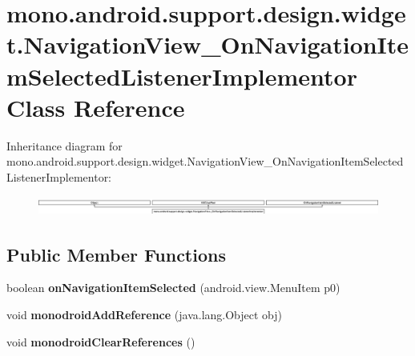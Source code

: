 \hypertarget{classmono_1_1android_1_1support_1_1design_1_1widget_1_1NavigationView__OnNavigationItemSelectedListenerImplementor}{}\section{mono.\+android.\+support.\+design.\+widget.\+Navigation\+View\+\_\+\+On\+Navigation\+Item\+Selected\+Listener\+Implementor Class Reference}
\label{classmono_1_1android_1_1support_1_1design_1_1widget_1_1NavigationView__OnNavigationItemSelectedListenerImplementor}
Inheritance diagram for mono.\+android.\+support.\+design.\+widget.\+Navigation\+View\+\_\+\+On\+Navigation\+Item\+Selected\+Listener\+Implementor\+:\begin{figure}[H]
\begin{center}
\leavevmode
\includegraphics[height=0.640366cm]{classmono_1_1android_1_1support_1_1design_1_1widget_1_1NavigationView__OnNavigationItemSelectedListenerImplementor}
\end{center}
\end{figure}
\subsection*{Public Member Functions}
\begin{DoxyCompactItemize}
\item 
\hypertarget{classmono_1_1android_1_1support_1_1design_1_1widget_1_1NavigationView__OnNavigationItemSelectedListenerImplementor_a7a1944dd1ff571ff377bd69245bdf594}{}boolean {\bfseries on\+Navigation\+Item\+Selected} (android.\+view.\+Menu\+Item p0)\label{classmono_1_1android_1_1support_1_1design_1_1widget_1_1NavigationView__OnNavigationItemSelectedListenerImplementor_a7a1944dd1ff571ff377bd69245bdf594}

\item 
\hypertarget{classmono_1_1android_1_1support_1_1design_1_1widget_1_1NavigationView__OnNavigationItemSelectedListenerImplementor_a8bc0b14e6513bff83883d834a9db2471}{}void {\bfseries monodroid\+Add\+Reference} (java.\+lang.\+Object obj)\label{classmono_1_1android_1_1support_1_1design_1_1widget_1_1NavigationView__OnNavigationItemSelectedListenerImplementor_a8bc0b14e6513bff83883d834a9db2471}

\item 
\hypertarget{classmono_1_1android_1_1support_1_1design_1_1widget_1_1NavigationView__OnNavigationItemSelectedListenerImplementor_a5afbcfa48efc997f1eaad7b5f3018d18}{}void {\bfseries monodroid\+Clear\+References} ()\label{classmono_1_1android_1_1support_1_1design_1_1widget_1_1NavigationView__OnNavigationItemSelectedListenerImplementor_a5afbcfa48efc997f1eaad7b5f3018d18}

\end{DoxyCompactItemize}


